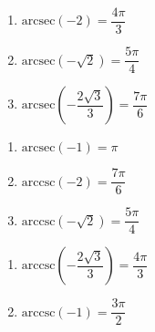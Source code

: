 \begin{multicols}{3} 

\begin{enumerate}

\setcounter{enumi}{\value{HW}}

\item $\mbox{arcsec} \left( -2 \right) = \dfrac{4\pi}{3}$ 
\item $\mbox{arcsec} \left( -\sqrt{2} \right) = \dfrac{5\pi}{4}$ 
\item $\mbox{arcsec} \left( -\dfrac{2\sqrt{3}}{3} \right) = \dfrac{7\pi}{6}$ 

\setcounter{HW}{\value{enumi}}

\end{enumerate}

\end{multicols}

\begin{multicols}{3} 

\begin{enumerate}

\setcounter{enumi}{\value{HW}}


\item $\mbox{arcsec} \left( -1 \right) = \pi$ 
\item $\mbox{arccsc} \left( -2 \right) = \dfrac{7\pi}{6}$ 
\item $\mbox{arccsc} \left( -\sqrt{2} \right) = \dfrac{5\pi}{4}$ 

\setcounter{HW}{\value{enumi}}

\end{enumerate}

\end{multicols}

\begin{multicols}{3} 

\begin{enumerate}

\setcounter{enumi}{\value{HW}}


\item $\mbox{arccsc} \left( -\dfrac{2\sqrt{3}}{3} \right) = \dfrac{4\pi}{3}$
\item $\mbox{arccsc} \left( -1 \right) = \dfrac{3\pi}{2}$ 

\setcounter{HW}{\value{enumi}}

\end{enumerate}

\end{multicols}


